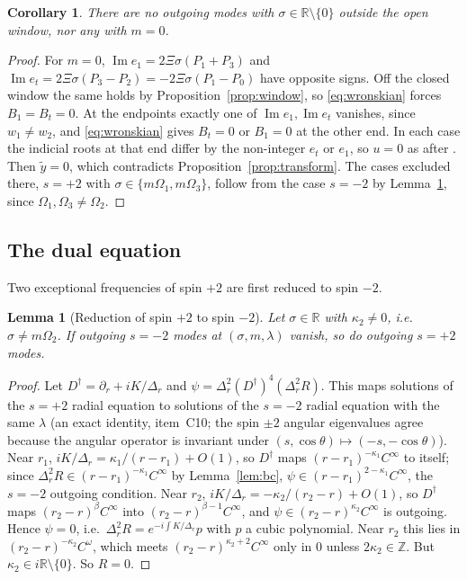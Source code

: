 \documentclass[11pt]{amsart}
\newtheorem{lemma}[theorem]{Lemma}
\newtheorem{corollary}[theorem]{Corollary}
\theoremstyle{definition}
\theoremstyle{remark}
\numberwithin{equation}{section}
\newcommand{\R}{\mathbb{R}}
\newcommand{\Z}{\mathbb{Z}}
\renewcommand{\Im}{\operatorname{Im}}
\begin{document}
\begin{corollary}\label{cor:outside}
There are no outgoing modes with $\sigma\in\R\setminus\{0\}$ outside the open window, nor any with $m=0$.
\end{corollary}
\begin{proof}
For $m=0$, $\Im e_1=2\Xi\sigma(P_1+P_3)$ and $\Im e_t=2\Xi\sigma(P_3-P_2)=-2\Xi\sigma(P_1-P_0)$ have opposite signs.
Off the closed window the same holds by Proposition~\ref{prop:window}, so \eqref{eq:wronskian} forces
$B_1=B_t=0$. At the endpoints exactly one of $\Im e_1,\Im e_t$ vanishes, since $w_1\ne w_2$, and
\eqref{eq:wronskian} gives $B_t=0$ or $B_1=0$ at the other end. In each case the indicial roots at that end differ by
the non-integer $e_t$ or $e_1$, so $u=0$ as after \cite[(3.6)]{Hin26}. Then $\tilde y=0$, which contradicts
Proposition~\ref{prop:transform}. The cases excluded there, $s=+2$ with $\sigma\in\{m\Omega_1,m\Omega_3\}$, follow from the case $s=-2$ by
Lemma~\ref{lem:TSthr}, since $\Omega_1,\Omega_3\ne\Omega_2$.
\end{proof}

\subsection{The dual equation}\label{subsec:dual}
Two exceptional frequencies of spin $+2$ are first reduced to spin $-2$.

\begin{lemma}[Reduction of spin $+2$ to spin $-2$]\label{lem:TSthr}
Let $\sigma\in\R$ with $\kappa_2\ne0$, i.e.\ $\sigma\ne m\Omega_2$. If outgoing $s=-2$ modes at $(\sigma,m,\lambda)$ vanish, so do
outgoing $s=+2$ modes.
\end{lemma}
\begin{proof}
Let $D^\dagger=\partial_r+iK/\Delta_r$ and $\psi=\Delta_r^2(D^\dagger)^4(\Delta_r^2R)$. This maps solutions of the $s=+2$
radial equation to solutions of the $s=-2$ radial equation with the same $\lambda$ (an exact identity, item~C10; the
spin $\pm2$ angular eigenvalues agree because the angular operator is invariant under $(s,\cos\theta)\mapsto(-s,-\cos\theta)$).
Near $r_1$, $iK/\Delta_r=\kappa_1/(r-r_1)+O(1)$, so $D^\dagger$ maps $(r-r_1)^{-\kappa_1}C^\infty$ to itself; since
$\Delta_r^2R\in(r-r_1)^{-\kappa_1}C^\infty$ by Lemma~\ref{lem:bc}, $\psi\in(r-r_1)^{2-\kappa_1}C^\infty$, the $s=-2$ outgoing
condition. Near $r_2$, $iK/\Delta_r=-\kappa_2/(r_2-r)+O(1)$, so
$D^\dagger$ maps $(r_2-r)^\beta C^\infty$ into $(r_2-r)^{\beta-1}C^\infty$, and $\psi\in(r_2-r)^{\kappa_2}C^\infty$ is
outgoing. Hence $\psi=0$, i.e.\ $\Delta_r^2R=e^{-i\int K/\Delta_r}p$ with $p$ a cubic polynomial. Near $r_2$ this lies
in $(r_2-r)^{-\kappa_2}C^\omega$, which meets $(r_2-r)^{\kappa_2+2}C^\infty$ only in $0$ unless $2\kappa_2\in\Z$. But
$\kappa_2\in i\R\setminus\{0\}$. So $R=0$.
\end{proof}
\end{document}
